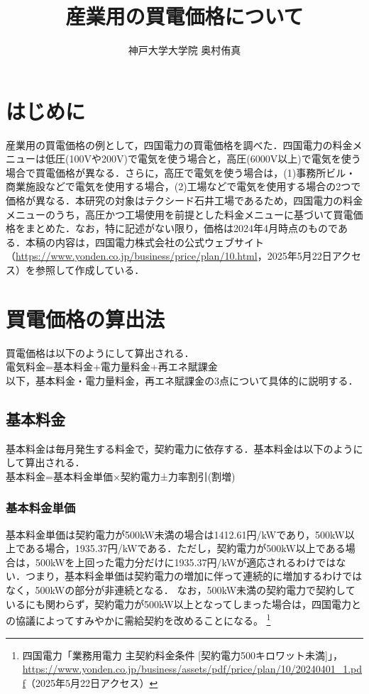 \documentclass{jarticle}
\title{産業用の買電価格について}
\author{神戸大学大学院 奥村侑真}
\date{}
\begin{document}
\maketitle

\section{はじめに}
産業用の買電価格の例として，四国電力の買電価格を調べた．四国電力の料金メニューは低圧(100Vや200V)で電気を使う場合と，高圧(6000V以上)で電気を使う場合で買電価格が異なる．さらに，高圧で電気を使う場合は，(1)事務所ビル・商業施設などで電気を使用する場合，(2)工場などで電気を使用する場合の2つで価格が異なる．本研究の対象はテクシード石井工場であるため，四国電力の料金メニューのうち，高圧かつ工場使用を前提とした料金メニューに基づいて買電価格をまとめた．なお，特に記述がない限り，価格は2024年4月時点のものである．本稿の内容は，四国電力株式会社の公式ウェブサイト（\url{https://www.yonden.co.jp/business/price/plan/10.html}，2025年5月22日アクセス）を参照して作成している．

\section{買電価格の算出法}
買電価格は以下のようにして算出される．\\
電気料金=基本料金+電力量料金+再エネ賦課金\\
以下，基本料金・電力量料金，再エネ賦課金の3点について具体的に説明する．

\subsection{基本料金}
基本料金は毎月発生する料金で，契約電力に依存する．基本料金は以下のようにして算出される．\\
基本料金=基本料金単価×契約電力±力率割引(割増)\\
\subsubsection{基本料金単価}
基本料金単価は契約電力が500kW未満の場合は1412.61円/kWであり，500kW以上である場合，1935.37円/kWである．ただし，契約電力が500kW以上である場合は，500kWを上回った電力分だけに1935.37円/kWが適応されるわけではない．つまり，基本料金単価は契約電力の増加に伴って連続的に増加するわけではなく，500kWの部分が非連続となる．
なお，500kW未満の契約電力で契約しているにも関わらず，契約電力が500kW以上となってしまった場合は，四国電力との協議によってすみやかに需給契約を改めることになる。
\footnote{四国電力「業務用電力 主契約料金条件 [契約電力500キロワット未満]」，\url{https://www.yonden.co.jp/business/assets/pdf/price/plan/10/20240401_1.pdf}（2025年5月22日アクセス）}
\end{document}

